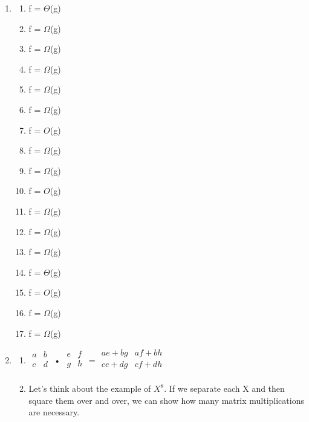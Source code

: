 \documentclass[12pt,letterpaper]{article}
\begin{document}
    \begin{enumerate}
    \item
      \begin{enumerate}
      \item f = \(\Theta\)(g)
      \item f = \(\Omega\)(g)
      \item f = \(\Omega\)(g)
      \item f = \(\Omega\)(g)
      \item f = \(\Omega\)(g)
      \item f = \(\Omega\)(g)
      \item f = \(O\)(g)
      \item f = \(\Omega\)(g)
      \item f = \(\Omega\)(g)
      \item f = \(O\)(g)
      \item f = \(\Omega\)(g)
      \item f = \(\Omega\)(g)
      \item f = \(\Omega\)(g)
      \item f = \(\Theta\)(g)
      \item f = \(O\)(g)
      \item f = \(\Omega\)(g)
      \item f = \(\Omega\)(g)
      \end{enumerate}
    \item
      \begin{enumerate}
      \item
        $
        \begin{array}{cc}
        a & b \\
        c & d \\
        \end{array}$
        •
        $
        \begin{array}{cc}
        e & f \\
        g & h \\
        \end{array}$
        =
        $
        \begin{array}{cc}
        ae + bg & af + bh \\
        ce + dg & cf + dh \\
        \end{array}$
      \item
        Let's think about the example of $X^8$. If we separate each X and then 			square them over and over, we can show how many matrix multiplications 			are necessary.
        \newline

\end{enumerate}
\end{enumerate}
\end{document}
